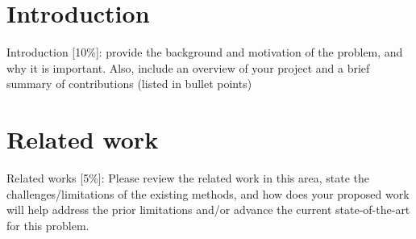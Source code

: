 \documentclass{article}
\newcommand{\instructions}[1]{{\color{blue} #1}}
\begin{document}


\section{Introduction}
\instructions{Introduction [10\%]: provide the background and motivation of the problem, and why it is important. Also, include an overview of your project and a brief summary of contributions (listed in bullet points)}


\section{Related work}
\instructions{Related works [5\%]: Please review the related work in this area, state the challenges/limitations of the existing methods, and how does your proposed work will help address the prior limitations and/or advance the current state-of-the-art for this problem.}
\end{document}
